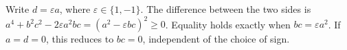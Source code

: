 Write $d=\varepsilon a$, where $\varepsilon\in\{1,-1\}$. The difference between the two sides is $a^4+b^2c^2-2\varepsilon a^2bc=(a^2-\varepsilon bc)^2\ge0$. Equality holds exactly when $bc=\varepsilon a^2$. If $a=d=0$, this reduces to $bc=0$, independent of the choice of sign.
